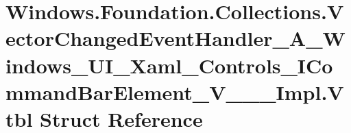 \hypertarget{struct_windows_1_1_foundation_1_1_collections_1_1_vector_changed_event_handler___a___windows___ud3b80c77359cead1f814fa39c92b857f}{}\section{Windows.\+Foundation.\+Collections.\+Vector\+Changed\+Event\+Handler\+\_\+\+A\+\_\+\+Windows\+\_\+\+U\+I\+\_\+\+Xaml\+\_\+\+Controls\+\_\+\+I\+Command\+Bar\+Element\+\_\+\+V\+\_\+\+\_\+\+\_\+\+Impl.\+Vtbl Struct Reference}
\label{struct_windows_1_1_foundation_1_1_collections_1_1_vector_changed_event_handler___a___windows___ud3b80c77359cead1f814fa39c92b857f}
